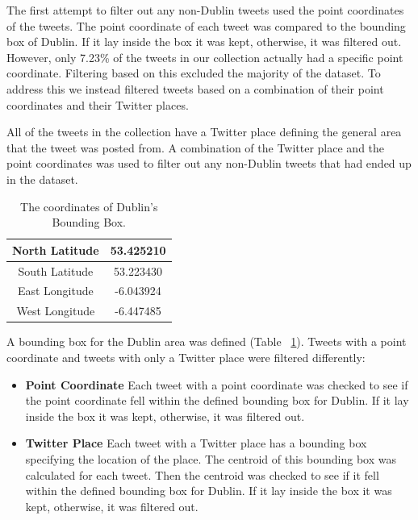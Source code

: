 The first attempt to filter out any non-Dublin tweets used the point coordinates of the tweets. The point coordinate of each tweet was compared to the bounding box of Dublin. If it lay inside the box it was kept, otherwise, it was filtered out. However, only 7.23\% of the tweets in our collection actually had a specific point coordinate. Filtering based on this excluded the majority of the dataset. To address this we instead filtered tweets based on a combination of their point coordinates and their Twitter places.

All of the tweets in the collection have a Twitter place defining the general area that the tweet was posted from. A combination of the Twitter place and the point coordinates was used to filter out any non-Dublin tweets that had ended up in the dataset. 

\begin{table}[h!]
\caption{The coordinates of Dublin's Bounding Box.}
\label{tab:dublinbb}
\setlength\extrarowheight{5pt}
\begin{tabular}{|c|c|}
\hline
North Latitude  & 53.425210 \\ \hline
South Latitude  & 53.223430 \\ \hline
East Longitude & -6.043924 \\ \hline
West Longitude & -6.447485 \\ \hline
\end{tabular}
\end{table}

A bounding box for the Dublin area was defined (Table ~\ref{tab:dublinbb}). Tweets with a point coordinate and tweets with only a Twitter place were filtered differently:
\begin{itemize}
    \item \textbf{Point Coordinate}\newline
    Each tweet with a point coordinate was checked to see if the point coordinate fell within the defined bounding box for Dublin. If it lay inside the box it was kept, otherwise, it was filtered out.
    \item \textbf{Twitter Place}\newline
    Each tweet with a Twitter place has a bounding box specifying the location of the place. The centroid of this bounding box was calculated for each tweet. Then the centroid was checked to see if it fell within the defined bounding box for Dublin. If it lay inside the box it was kept, otherwise, it was filtered out.
\end{itemize}

